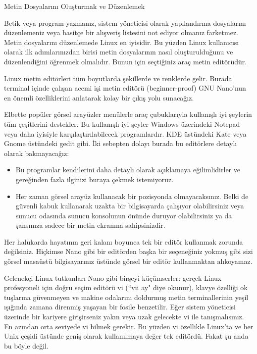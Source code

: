 \begin{section}{Metin Dosyalarını Oluşturmak ve Düzenlemek}

Betik veya program yazmanız, sistem yöneticisi olarak yapılandırma dosyalarını düzenlemeniz veya basitçe bir alışveriş listesini not ediyor olmanız farketmez. Metin dosyalarını düzenlemede Linux en iyisidir. Bu yüzden Linux kullanıcısı olarak ilk adımlarınızdan birisi metin dosyalarının nasıl oluşturulduğunu ve düzenlendiğini öğrenmek olmalıdır. Bunun için seçtiğiniz araç metin editörüdür. 

Linux metin editörleri tüm boyutlarda şekillerde ve renklerde gelir. Burada terminal içinde çalışan acemi işi metin editörü (beginner-proof) GNU Nano’nun en önemli özelliklerini anlatarak kolay bir çıkış yolu sunacağız.

Elbette popüler görsel arayüzler menülerle araç çubuklarıyla kullanışlı iyi şeylerin tüm çeşitlerini destekler.  Bu kullanışlı iyi şeyler Windows üzerindeki Notepad veya daha iyisiyle karşılaştırılabilecek programlardır. KDE üstündeki Kate veya Gnome üstündeki gedit gibi. İki sebepten dolayı  burada bu editörlere detaylı olarak bakmayacağız:

\begin{itemize}
\item Bu programlar kendilerini daha detaylı olarak açıklamaya eğilimlidirler ve gereğinden fazla ilginizi buraya çekmek istemiyoruz. 
\item Her zaman görsel arayüz kullanacak bir pozisyonda olmayacaksınız. Belki de güvenli kabuk kullanarak uzakta bir bilgisayarda çalışıyor olabilirsiniz veya sunucu odasında sunucu konsolunun önünde duruyor olabilirsiniz ya da şansınıza sadece bir metin ekranına sahipsinizdir. 
\end{itemize}

Her halukarda hayatının geri kalanı boyunca tek bir editör kullanmak zorunda değilsiniz. Hiçkimse Nano gibi bir editörden başka bir seçeneğiniz yokmuş gibi sizi görsel masaüstü bilgisayarınız üstünde görsel bir editör kullanmaktan alıkoyamaz.
 
Gelenekçi Linux tutkunları Nano gibi birşeyi küçümserler: gerçek Linux profesyoneli için doğru seçim editörü vi (“vii ay" diye okunur), klavye özelliği ok tuşlarına güvenmeyen ve makine odalarını doldurmuş metin terminallerinin yeşil ışığında zamana direnmiş yaşayan bir fosile benzetilir. Eğer sistem yöneticisi üzerinde bir kariyere girişirseniz yakın veya uzak gelecekte vi ile tanışmalısınız. En azından orta seviyede vi bilmek gerekir. Bu yüzden vi özellikle Linux’ta ve her Unix çeşidi üstünde geniş olarak kullanılmaya değer tek editördü. Fakat şu anda bu böyle değil. 


\end{section}
